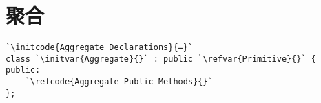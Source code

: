 \section{聚合}\label{sec:聚合}

\begin{lstlisting}
`\initcode{Aggregate Declarations}{=}`
class `\initvar{Aggregate}{}` : public `\refvar{Primitive}{}` {
public:
    `\refcode{Aggregate Public Methods}{}`
};
\end{lstlisting}